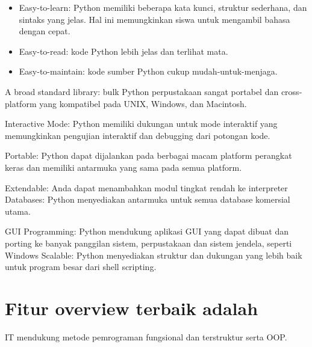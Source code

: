 {{{{{{{{\begin{itemize}
\item Easy-to-learn: Python memiliki beberapa kata kunci, struktur sederhana, dan sintaks yang jelas. $  $Hal ini memungkinkan siswa untuk mengambil bahasa dengan cepat. \par
\noindent 
\item Easy-to-read: kode Python lebih jelas dan terlihat mata. \par
\noindent 
\item Easy-to-maintain: kode sumber Python cukup mudah-untuk-menjaga.\end{itemize}
 \par
\vspace{\baselineskip}
\noindent 
\noindent 
{\fontsize{14pt}{14pt}\selectfont
A broad standard library: bulk Python perpustakaan sangat portabel dan cross-platform yang kompatibel pada UNIX, Windows, dan Macintosh. \par
\vspace{\baselineskip}
\noindent 
Interactive Mode: Python memiliki dukungan untuk mode interaktif yang memungkinkan pengujian interaktif dan debugging dari potongan kode. \par
\vspace{\baselineskip}
\noindent 
Portable: Python dapat dijalankan pada berbagai macam platform perangkat keras dan memiliki antarmuka yang sama pada semua platform. \par
\vspace{\baselineskip}
\noindent 
Extendable: Anda dapat menambahkan modul tingkat rendah ke interpreter Databases: Python menyediakan antarmuka untuk semua database komersial utama. \par
\vspace{\baselineskip}
\noindent 
\noindent 
{\fontsize{14pt}{14pt}\selectfont
GUI Programming: Python mendukung aplikasi GUI yang dapat dibuat dan porting ke banyak panggilan sistem, perpustakaan dan sistem jendela, seperti Windows Scalable: Python menyediakan struktur dan dukungan yang lebih baik untuk program besar dari shell scripting. \par
\vspace{\baselineskip}
\noindent 
{\fontsize{14pt}{14pt}\section
{Fitur overview terbaik adalah}
\vspace{\baselineskip}
\noindent 
IT mendukung metode pemrograman fungsional dan terstruktur serta OOP. \par
}}}}}}}}}}}
